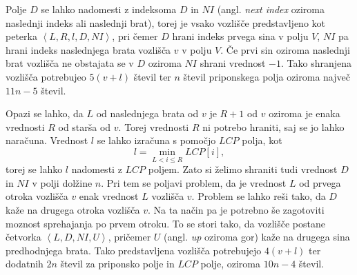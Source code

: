 Polje $D$ se lahko nadomesti z indeksoma $D$ in $NI$ (angl. \textit{next index} oziroma naslednji indeks ali naslednji brat), torej je vsako vozlišče predstavljeno kot peterka $\left< L, R, l, D, NI \right>$, pri čemer $D$ hrani indeks prvega sina v polju $V$, $NI$ pa hrani indeks naslednjega brata vozlišča $v$ v polju $V$. Če prvi sin oziroma naslednji brat vozlišča ne obstajata se v $D$ oziroma $NI$ shrani vrednost $-1$. Tako shranjena vozlišča potrebujeo $5(v+l)$ števil ter $n$ števil priponskega polja oziroma največ $11n-5$ števil.

Opazi se lahko, da $L$ od naslednjega brata od $v$ je $R+1$ od $v$ oziroma je enaka vrednosti $R$ od starša od $v$. Torej vrednosti $R$ ni potrebo hraniti, saj se jo lahko naračuna. Vrednost $l$ se lahko izračuna s pomočjo $LCP$ polja, kot
$$l=\min_{L<i\le R}LCP[i],$$
torej se lahko $l$ nadomesti z $LCP$ poljem. Zato si želimo shraniti tudi vrednost $D$ in $NI$ v polji dolžine $n$. Pri tem se poljavi problem, da je vrednost $L$ od prvega otroka vozlišča $v$ enak vrednost $L$ vozlišča $v$. Problem se lahko reši tako, da $D$ kaže na drugega otroka vozlišča $v$. Na ta način pa je potrebno še zagotoviti moznost sprehajanja po prvem otroku. To se stori tako, da vozlišče postane četvorka $\left< L, D, NI, U \right>$, pričemer $U$ (angl. \textit{up} oziroma gor) kaže na drugega sina predhodnjega brata. Tako predstavljena vozlišča potrebujejo $4(v+l)$ ter dodatnih $2n$ števil za priponsko polje in $LCP$ polje, oziroma $10n-4$ števil.


